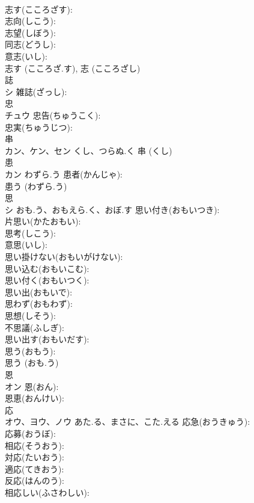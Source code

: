 \documentclass[8pt]{extreport}
\begin{document}
\begin{CJK}{UTF8}{min}
\\	志す(こころざす): 
\\	志向(しこう): 
\\	志望(しぼう): 
\\	同志(どうし): 
\\	意志(いし): 
\\	志す (こころざ.す), 志 (こころざし)
\\	誌			
\\	シ		雑誌(ざっし): 
\\	忠			
\\	チュウ		忠告(ちゅうこく): 
\\	忠実(ちゅうじつ): 
\\	串			
\\	カン、ケン、セン	くし、つらぬ.く		串 (くし)
\\	患			
\\	カン	わずら.う	患者(かんじゃ): 
\\	患う (わずら.う)
\\	思			
\\	シ	おも.う、おもえら.く、おぼ.す	思い付き(おもいつき): 
\\	片思い(かたおもい): 
\\	思考(しこう): 
\\	意思(いし): 
\\	思い掛けない(おもいがけない): 
\\	思い込む(おもいこむ): 
\\	思い付く(おもいつく): 
\\	思い出(おもいで): 
\\	思わず(おもわず): 
\\	思想(しそう): 
\\	不思議(ふしぎ): 
\\	思い出す(おもいだす): 
\\	思う(おもう): 
\\	思う (おも.う)
\\	恩			
\\	オン		恩(おん): 
\\	恩恵(おんけい): 
\\	応			
\\	オウ、ヨウ、ノウ	あた.る、まさに、こた.える	応急(おうきゅう): 
\\	応募(おうぼ): 
\\	相応(そうおう): 
\\	対応(たいおう): 
\\	適応(てきおう): 
\\	反応(はんのう): 
\\	相応しい(ふさわしい): 

\end{CJK}
\end{document}
